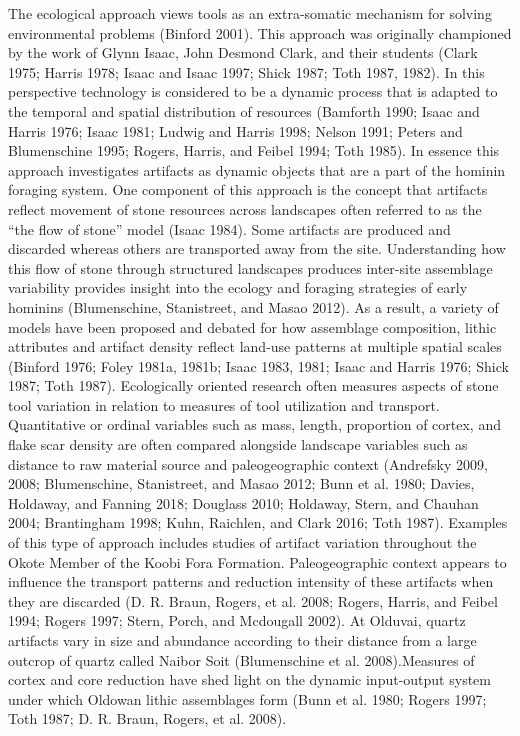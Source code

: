 \documentclass[]{elsarticle} %
\begin{document}
The ecological approach views tools as an extra-somatic mechanism for
solving environmental problems (Binford 2001). This approach was
originally championed by the work of Glynn Isaac, John Desmond Clark,
and their students (Clark 1975; Harris 1978; Isaac and Isaac 1997; Shick
1987; Toth 1987, 1982). In this perspective technology is considered to
be a dynamic process that is adapted to the temporal and spatial
distribution of resources (Bamforth 1990; Isaac and Harris 1976; Isaac
1981; Ludwig and Harris 1998; Nelson 1991; Peters and Blumenschine 1995;
Rogers, Harris, and Feibel 1994; Toth 1985). In essence this approach
investigates artifacts as dynamic objects that are a part of the hominin
foraging system. One component of this approach is the concept that
artifacts reflect movement of stone resources across landscapes often
referred to as the ``the flow of stone'' model (Isaac 1984). Some
artifacts are produced and discarded whereas others are transported away
from the site. Understanding how this flow of stone through structured
landscapes produces inter-site assemblage variability provides insight
into the ecology and foraging strategies of early hominins
(Blumenschine, Stanistreet, and Masao 2012). As a result, a variety of
models have been proposed and debated for how assemblage composition,
lithic attributes and artifact density reflect land-use patterns at
multiple spatial scales (Binford 1976; Foley 1981a, 1981b; Isaac 1983,
1981; Isaac and Harris 1976; Shick 1987; Toth 1987). Ecologically
oriented research often measures aspects of stone tool variation in
relation to measures of tool utilization and transport. Quantitative or
ordinal variables such as mass, length, proportion of cortex, and flake
scar density are often compared alongside landscape variables such as
distance to raw material source and paleogeographic context (Andrefsky
2009, 2008; Blumenschine, Stanistreet, and Masao 2012; Bunn et al. 1980;
Davies, Holdaway, and Fanning 2018; Douglass 2010; Holdaway, Stern, and
Chauhan 2004; Brantingham 1998; Kuhn, Raichlen, and Clark 2016; Toth
1987). Examples of this type of approach includes studies of artifact
variation throughout the Okote Member of the Koobi Fora Formation.
Paleogeographic context appears to influence the transport patterns and
reduction intensity of these artifacts when they are discarded (D. R.
Braun, Rogers, et al. 2008; Rogers, Harris, and Feibel 1994; Rogers
1997; Stern, Porch, and Mcdougall 2002). At Olduvai, quartz artifacts
vary in size and abundance according to their distance from a large
outcrop of quartz called Naibor Soit (Blumenschine et al. 2008).Measures
of cortex and core reduction have shed light on the dynamic input-output
system under which Oldowan lithic assemblages form (Bunn et al. 1980;
Rogers 1997; Toth 1987; D. R. Braun, Rogers, et al. 2008).
\end{document}
